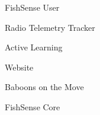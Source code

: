 \item FishSense User
\item Radio Telemetry Tracker
\item Active Learning
\item Website
\item Baboons on the Move
\item FishSense Core
